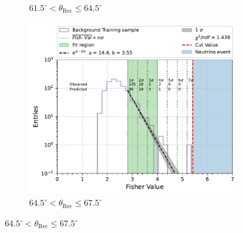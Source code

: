 \begin{figure}[h!]
\begin{subfigure}[r]{.48\textwidth}
     \caption{$ 61.5^{\circ} <\theta_{\text{Rec}} \leq 64.5^{\circ}$}
    \end{subfigure}
    \hfill
    \begin{subfigure}[l]{.48\textwidth}
      \centering
      \includegraphics[width=\linewidth]{thesis_figures/Nu_analysis/Fisher_plots/Fisher_fit_region_64.5_67.5.pdf}
      \caption{$ 64.5^{\circ} <\theta_{\text{Rec}} \leq 67.5^{\circ}$}
    \end{subfigure}


\end{figure}
